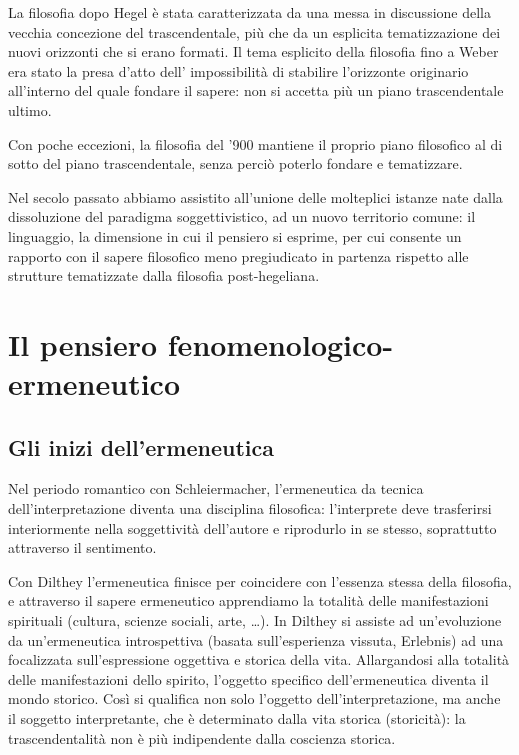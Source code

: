 La filosofia dopo Hegel è stata caratterizzata
da una messa in discussione della vecchia concezio­ne del trascendentale, più che da un esplicita
tematizzazione dei nuovi orizzonti che si erano
formati. Il tema esplicito della filosofia
fino a Weber era stato la presa d'atto dell'
impossibilità di stabilire l'orizzonte originario
all'interno del quale fondare il sapere: non si
accetta più un piano trascendentale ultimo.

Con poche eccezioni, la filosofia del '900
mantiene il proprio piano filosofico al di sotto
del piano trascendentale, senza perciò poterlo
fondare e tematizzare.

Nel secolo passato abbiamo assistito all'unione
delle molteplici istanze nate dalla dissoluzione
del paradigma soggettivistico, ad un nuovo
territorio comune: il linguaggio, la dimensione
in cui il pensiero si esprime, per cui consente
un rapporto con il sapere filosofico meno pregiudicato in partenza rispetto alle strutture tematizzate dalla filosofia post-hegeliana.

\chapter{Il pensiero fenomenologico-ermeneutico}
\bigskip
\bigskip
\section{Gli inizi dell'ermeneutica}

Nel periodo romantico con Schleiermacher,
l'ermeneutica da tecnica dell'interpretazione diventa  una disciplina filosofica: l'interprete deve
trasferirsi interiormente nella soggettività dell'autore e riprodurlo in se stesso, soprattutto
attraverso il sentimento.

Con Dilthey l'ermeneutica finisce per coincidere
con l'essenza stessa della filosofia, e attraverso
il sapere ermeneutico apprendiamo la totalità delle
manifestazioni spirituali (cultura, scienze sociali, arte, \dots).
In Dilthey si assiste ad un'evoluzione da un'ermeneutica introspettiva (basata sull'esperienza
vissuta, Erlebnis) ad una focalizzata sull'espressione oggettiva e storica della vita.
Allargandosi alla totalità delle manifestazioni
dello spirito, l'oggetto specifico dell'ermeneutica
diventa il mondo storico.
Così si qualifica non solo l'oggetto dell'interpretazione,
ma anche il soggetto interpretante, che è determinato dalla vita storica (storicità): la trascendentalità non è più indipendente dalla coscienza
storica.

